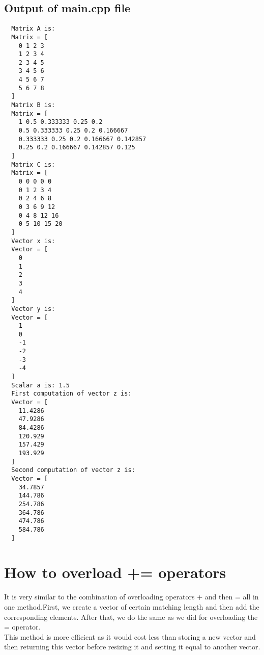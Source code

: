 \documentclass{article}
\begin{document}
\subsection{Output of main.cpp file}
\begin{lstlisting}
  Matrix A is:
  Matrix = [
    0 1 2 3
    1 2 3 4
    2 3 4 5
    3 4 5 6
    4 5 6 7
    5 6 7 8
  ]
  Matrix B is:
  Matrix = [
    1 0.5 0.333333 0.25 0.2
    0.5 0.333333 0.25 0.2 0.166667
    0.333333 0.25 0.2 0.166667 0.142857
    0.25 0.2 0.166667 0.142857 0.125
  ]
  Matrix C is:
  Matrix = [
    0 0 0 0 0
    0 1 2 3 4
    0 2 4 6 8
    0 3 6 9 12
    0 4 8 12 16
    0 5 10 15 20
  ]
  Vector x is:
  Vector = [
    0
    1
    2
    3
    4
  ]
  Vector y is:
  Vector = [
    1
    0
    -1
    -2
    -3
    -4
  ]
  Scalar a is: 1.5
  First computation of vector z is:
  Vector = [
    11.4286
    47.9286
    84.4286
    120.929
    157.429
    193.929
  ]
  Second computation of vector z is:
  Vector = [
    34.7857
    144.786
    254.786
    364.786
    474.786
    584.786
  ]
\end{lstlisting}
\section{How to overload += operators}
It is very similar to the combination of overloading operators + and then = all in one method.First, we create a vector of certain matching length and then add the corresponding elements. After that, we do the same as we did for overloading the = operator.\\
This method is more efficient as it would cost less than storing a new vector and then returning this vector before resizing it and setting it equal to another vector.
\end{document}
